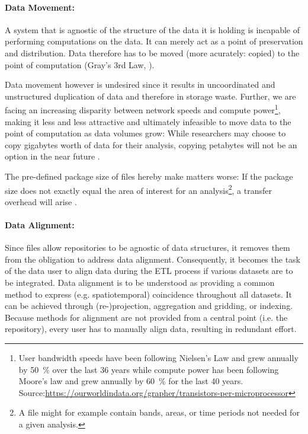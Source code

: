 \documentclass[letterpaper, parskip=half]{scrartcl}
\begin{document}
\paragraph{Data Movement:}
A system that is agnostic of the structure of the data it is holding is incapable of performing computations on the data. 
It can merely act as a point of preservation and distribution. Data therefore has to be moved (more acurately: copied) to the point of computation (Gray's 3rd Law, \cite{Szalay2009}).

Data movement however is undesired since it results in uncoordinated and unstructured duplication of data and therefore in storage waste.
Further, we are facing an increasing disparity between network speeds and compute power\footnote{User bandwidth speeds have been following Nielsen's Law \citep{Nielsen1998} and grew annually by \SI{50}{\percent} over the last 36 years while compute power has been following Moore's law \citep{Moore1975} and grew annually by \SI{60}{\percent} for the last 40 years. Source:\url{https://ourworldindata.org/grapher/transistors-per-microprocessor}}, making it less and less attractive and ultimately infeasible to move data to the point of computation \citep{Hey2009} as data volumes grow: While researchers may choose to copy gigabytes worth of data for their analysis, copying petabytes will not be an option in the near future \citep{Szalay2006}.

The pre-defined package size of files hereby make matters worse: If the package size does not exactly equal the area of interest for an analysis\footnote{A file might for example contain bands, areas, or time periods not needed for a given analysis.}, a transfer overhead will arise \citep{Gray2002}.

\paragraph{Data Alignment:}
Since files allow repositories to be agnostic of data structures, it removes them from the obligation to address data alignment.
Consequently, it becomes the task of the data user to align data during the \gls{ETL} process if various datasets are to be integrated.
Data alignment is to be understood as providing a common method to express (e.g. spatiotemporal) coincidence throughout all datasets.
It can be achieved through (re-)projection, aggregation and gridding, or indexing.
Because methods for alignment are not provided from a central point (i.e. the repository), every user has to manually align data, resulting in redundant effort.
\end{document}
